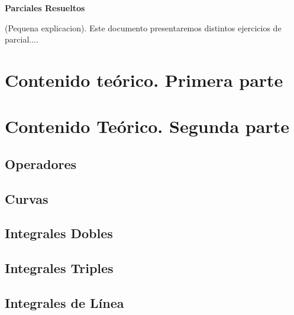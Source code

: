 \documentclass[10pt, a4paper]{report}
\theoremstyle{definition} %
\begin{document}
    \newpage

    \setcounter{page}{1}
    \begin{center}
        \textbf{ \noindent \textbf{Parciales Resueltos}}
    \end{center}
    \vspace{3cm}
      
    (Pequena explicacion).  Este documento presentaremos distintos ejercicios de parcial....
    \newpage

    \tableofcontents
        \setcounter{page}{1}

    \chapter{Contenido teórico. Primera parte}

    \chapter{Contenido Teórico. Segunda parte}
        \section{Operadores}
            
        \section{Curvas}
            
        \section{Integrales Dobles} 
            
        \section{Integrales Triples}
            
        \section{Integrales de L\'inea}
            
\end{document}
